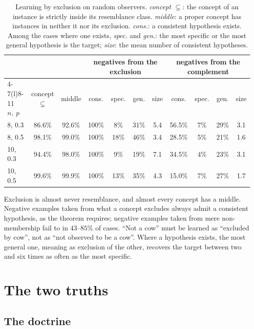 \documentclass[11pt]{article}
\theoremstyle{plain}
\theoremstyle{definition}
\begin{document}
\begin{table}[ht]
\centering
\small
\setlength{\tabcolsep}{4pt}
\begin{tabular}{@{}lcc cccc cccc@{}}
\toprule
 & & & \multicolumn{4}{c}{negatives from the exclusion} &
  \multicolumn{4}{c}{negatives from the complement}\\
\cmidrule(lr){4-7}\cmidrule(l){8-11}
$n,\ p$ & concept $\subsetneq$ & middle & cons. & spec. & gen. & size &
  cons. & spec. & gen. & size\\
\midrule
8, 0.3 & 86.6\% & 92.6\% & 100\% & 8\% & 31\% & 5.4 & 56.5\% & 7\% & 29\% & 3.1\\
8, 0.5 & 98.1\% & 99.0\% & 100\% & 18\% & 46\% & 3.4 & 28.5\% & 5\% & 21\% & 1.6\\
10, 0.3 & 94.4\% & 98.0\% & 100\% & 9\% & 19\% & 7.1 & 34.5\% & 4\% & 23\% & 3.1\\
10, 0.5 & 99.6\% & 99.9\% & 100\% & 13\% & 35\% & 4.3 & 15.0\% & 7\% & 27\% & 1.7\\
\bottomrule
\end{tabular}
\caption{Learning by exclusion on random observers. \emph{concept $\subsetneq$}: the concept
of an instance is strictly inside its resemblance class. \emph{middle}: a proper concept has
instances in neither it nor its exclusion. \emph{cons.}: a consistent hypothesis exists.
Among the cases where one exists, \emph{spec.} and \emph{gen.}: the most specific or the most
general hypothesis is the target; \emph{size}: the mean number of consistent hypotheses.}
\label{tab:apoha}
\end{table}

\noindent Exclusion is almost never resemblance, and almost every concept has a middle.
Negative examples taken from what a concept excludes always admit a consistent hypothesis, as
the theorem requires; negative examples taken from mere non-membership fail to in $43$--$85\%$
of cases. ``Not a cow'' must be learned as ``excluded by cow'', not as ``not observed to be a
cow''. Where a hypothesis exists, the most general one, meaning as exclusion of the other,
recovers the target between two and six times as often as the most specific.

\section{The two truths}
\label{sec:twotruths}

\subsection{The doctrine}
\end{document}
